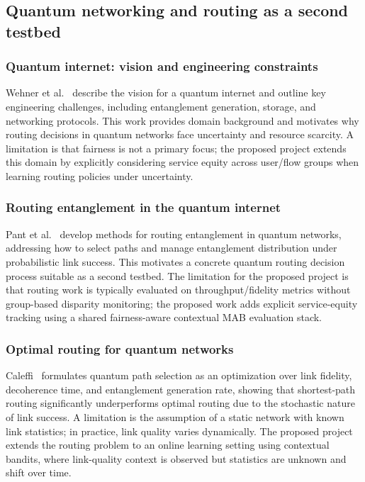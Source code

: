 \documentclass[conference]{IEEEtran}
\begin{document}
\subsection{Quantum networking and routing as a second testbed}

\subsubsection{Quantum internet: vision and engineering constraints}
Wehner et al.~\cite{wehner2018quantum} describe the vision for a quantum internet and outline
key engineering challenges, including entanglement generation, storage, and networking
protocols. This work provides domain background and motivates why routing decisions in quantum
networks face uncertainty and resource scarcity. A limitation is that fairness is not a
primary focus; the proposed project extends this domain by explicitly considering service
equity across user/flow groups when learning routing policies under uncertainty.

\subsubsection{Routing entanglement in the quantum internet}
Pant et al.~\cite{pant2019routing} develop methods for routing entanglement in quantum
networks, addressing how to select paths and manage entanglement distribution under
probabilistic link success. This motivates a concrete quantum routing decision process
suitable as a second testbed. The limitation for the proposed project is that routing work
is typically evaluated on throughput/fidelity metrics without group-based disparity
monitoring; the proposed work adds explicit service-equity tracking using a shared
fairness-aware contextual MAB evaluation stack.

\subsubsection{Optimal routing for quantum networks}
Caleffi~\cite{caleffi2017optimal} formulates quantum path selection as an optimization over
link fidelity, decoherence time, and entanglement generation rate, showing that shortest-path
routing significantly underperforms optimal routing due to the stochastic nature of link
success. A limitation is the assumption of a static network with known link statistics; in
practice, link quality varies dynamically. The proposed project extends the routing problem
to an online learning setting using contextual bandits, where link-quality context is observed
but statistics are unknown and shift over time.
\end{document}
